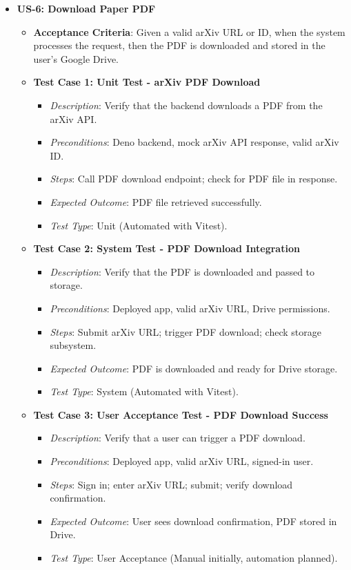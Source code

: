 \documentclass[12pt]{article}
\begin{document}
\begin{itemize}
  \item \textbf{US-6: Download Paper PDF}
    \begin{itemize}
      \item \textbf{Acceptance Criteria}: Given a valid arXiv URL or ID, when the system processes the request, then the PDF is downloaded and stored in the user's Google Drive.
      \item \textbf{Test Case 1: Unit Test - arXiv PDF Download}
        \begin{itemize}
          \item \textit{Description}: Verify that the backend downloads a PDF from the arXiv API.
          \item \textit{Preconditions}: Deno backend, mock arXiv API response, valid arXiv ID.
          \item \textit{Steps}: Call PDF download endpoint; check for PDF file in response.
          \item \textit{Expected Outcome}: PDF file retrieved successfully.
          \item \textit{Test Type}: Unit (Automated with Vitest).
        \end{itemize}
      \item \textbf{Test Case 2: System Test - PDF Download Integration}
        \begin{itemize}
          \item \textit{Description}: Verify that the PDF is downloaded and passed to storage.
          \item \textit{Preconditions}: Deployed app, valid arXiv URL, Drive permissions.
          \item \textit{Steps}: Submit arXiv URL; trigger PDF download; check storage subsystem.
          \item \textit{Expected Outcome}: PDF is downloaded and ready for Drive storage.
          \item \textit{Test Type}: System (Automated with Vitest).
        \end{itemize}
      \item \textbf{Test Case 3: User Acceptance Test - PDF Download Success}
        \begin{itemize}
          \item \textit{Description}: Verify that a user can trigger a PDF download.
          \item \textit{Preconditions}: Deployed app, valid arXiv URL, signed-in user.
          \item \textit{Steps}: Sign in; enter arXiv URL; submit; verify download confirmation.
          \item \textit{Expected Outcome}: User sees download confirmation, PDF stored in Drive.
          \item \textit{Test Type}: User Acceptance (Manual initially, automation planned).
        \end{itemize}
    \end{itemize}


\end{itemize}
\end{document}
